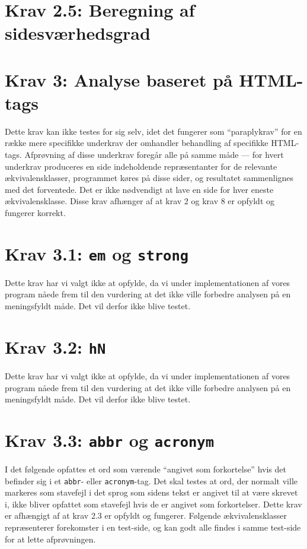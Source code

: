 \documentclass[a4paper,oneside,article, titlepage]{memoir}
\begin{document}
\section*{Krav 2.5: Beregning af sidesværhedsgrad}

\section*{Krav 3: Analyse baseret på HTML-tags}

Dette krav kan ikke testes for sig selv, idet det fungerer som
``paraplykrav'' for en række mere specifikke underkrav der omhandler
behandling af specifikke HTML-tags. Afprøvning af disse underkrav
foregår alle på samme måde --- for hvert underkrav produceres en side
indeholdende repræsentanter for de relevante ækvivalensklasser,
programmet køres på disse sider, og resultatet sammenlignes med det
forventede. Det er ikke nødvendigt at lave en side for hver eneste
ækvivalensklasse. Disse krav afhænger af at krav 2 og krav 8 er
opfyldt og fungerer korrekt.

\section*{Krav 3.1: \texttt{em} og \texttt{strong}}

Dette krav har vi valgt ikke at opfylde, da vi under implementationen
af vores program nåede frem til den vurdering at det ikke ville
forbedre analysen på en meningsfyldt måde. Det vil derfor ikke blive
testet.

\section*{Krav 3.2: \texttt{hN}}

Dette krav har vi valgt ikke at opfylde, da vi under implementationen
af vores program nåede frem til den vurdering at det ikke ville
forbedre analysen på en meningsfyldt måde. Det vil derfor ikke blive
testet.

\section*{Krav 3.3: \texttt{abbr} og \texttt{acronym}}

I det følgende opfattes et ord som værende ``angivet som forkortelse''
hvis det befinder sig i et \texttt{abbr}- eller
\texttt{acronym}-tag. Det skal testes at ord, der normalt ville
markeres som stavefejl i det sprog som sidens tekst er angivet til at
være skrevet i, ikke bliver opfattet som stavefejl hvis de er angivet
som forkortelser. Dette krav er afhængigt af at krav 2.3 er opfyldt og
fungerer. Følgende ækvivalensklasser repræsenterer forekomster i en
test-side, og kan godt alle findes i samme test-side for at lette
afprøvningen.
\end{document}
